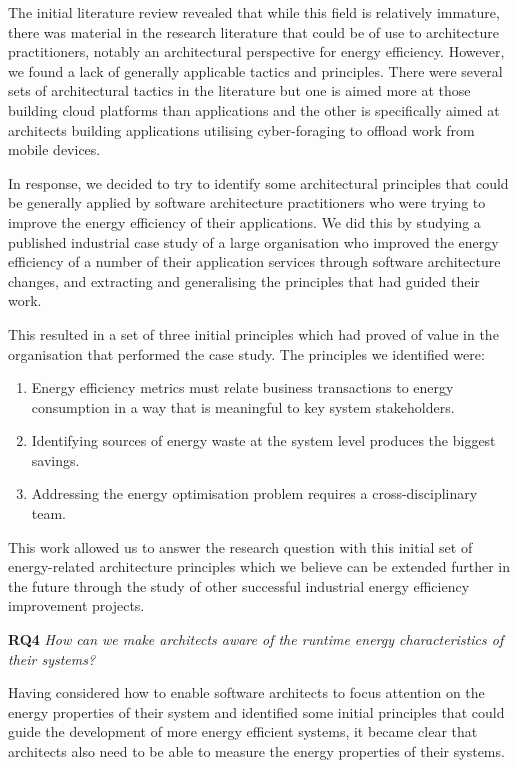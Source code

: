 The initial literature review revealed that while this field is relatively immature, there was material in the research literature that could be of use to architecture practitioners, notably an architectural perspective for energy efficiency. However, we found a lack of generally applicable tactics and principles.  There were several sets of architectural tactics in the literature \cite{lewis2015-foragingtactics,procaccianti2013-cloudenergyefficiency} but one is aimed more at those building cloud platforms than applications and the other is specifically aimed at architects building applications utilising cyber-foraging to offload work from mobile devices.

In response, we decided to try to identify some architectural principles that could be generally applied by software architecture practitioners who were trying to improve the energy efficiency of their applications.  We did this by studying a published industrial case study of a large organisation who improved the energy efficiency of a number of their application services through software architecture changes, and extracting and generalising the principles that had guided their work.

This resulted in a set of three initial principles which had proved of value in the organisation that performed the case study.  The principles we identified were:
\begin{enumerate}
	\item Energy efficiency metrics must relate business transactions to energy consumption in a way that is meaningful to key system stakeholders.
	\item Identifying sources of energy waste at the system level produces the biggest savings.
	\item Addressing the energy optimisation problem requires a cross-disciplinary team.
\end{enumerate}

This work allowed us to answer the research question with this initial set of energy-related architecture principles which we believe can be extended further in the future through the study of other successful industrial energy efficiency improvement projects.

\textbf{RQ4} \emph{How can we make architects aware of the runtime energy characteristics of their systems?}

Having considered how to enable software architects to focus attention on the energy properties of their system and identified some initial principles that could guide the development of more energy efficient systems, it became clear that architects also need to be able to measure the energy properties of their systems.

